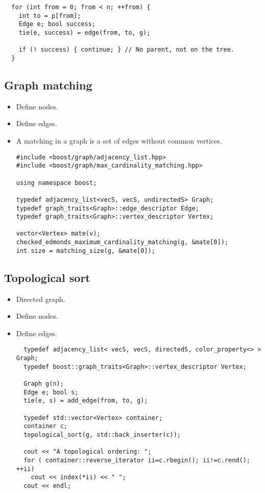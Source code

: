 \documentclass[guide.tex]{subfiles}
\begin{document}
\begin{itemize}
\begin{itemize}
\begin{verbatim}
  for (int from = 0; from < n; ++from) {
    int to = p[from];
    Edge e; bool success;
    tie(e, success) = edge(from, to, g);

    if (! success) { continue; } // No parent, not on the tree.
  }
\end{verbatim}
  \end{itemize}
\end{itemize}

\subsection{Graph matching}
\begin{itemize}
  \item Define nodes.
  \item Define edges.
  \item A matching in a graph is a set of edges without common vertices.

\begin{verbatim}
#include <boost/graph/adjacency_list.hpp>
#include <boost/graph/max_cardinality_matching.hpp>

using namespace boost;

typedef adjacency_list<vecS, vecS, undirectedS> Graph;
typedef graph_traits<Graph>::edge_descriptor Edge;
typedef graph_traits<Graph>::vertex_descriptor Vertex;

vector<Vertex> mate(v);
checked_edmonds_maximum_cardinality_matching(g, &mate[0]);
int size = matching_size(g, &mate[0]);
\end{verbatim}
\end{itemize}


\subsection{Topological sort}
\begin{itemize}
  \item Directed graph.
  \item Define nodes.
  \item Define edges.
\begin{verbatim}
  typedef adjacency_list< vecS, vecS, directedS, color_property<> > Graph;
  typedef boost::graph_traits<Graph>::vertex_descriptor Vertex;

  Graph g(n);
  Edge e; bool s;
  tie(e, s) = add_edge(from, to, g);

  typedef std::vector<Vertex> container;
  container c;
  topological_sort(g, std::back_inserter(c));

  cout << "A topological ordering: ";
  for ( container::reverse_iterator ii=c.rbegin(); ii!=c.rend(); ++ii)
    cout << index(*ii) << " ";
  cout << endl;
\end{verbatim}
\end{itemize}
\end{document}
